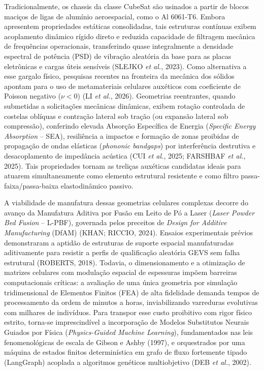 Tradicionalmente, os chassis da classe CubeSat são usinados a partir de blocos maciços de ligas de alumínio aeroespacial, como o Al 6061-T6. Embora apresentem propriedades estáticas consolidadas, tais estruturas contínuas exibem acoplamento dinâmico rígido direto e reduzida capacidade de filtragem mecânica de frequências operacionais, transferindo quase integralmente a densidade espectral de potência (PSD) de vibração aleatória da base para as placas eletrônicas e cargas úteis sensíveis (SLEJKO \textit{et al.}, 2023). Como alternativa a esse gargalo físico, pesquisas recentes na fronteira da mecânica dos sólidos apontam para o uso de metamateriais celulares auxéticos com coeficiente de Poisson negativo ($\nu < 0$) (LI \textit{et al.}, 2026). Geometrias reentrantes, quando submetidas a solicitações mecânicas dinâmicas, exibem rotação controlada de costelas oblíquas e contração lateral sob tração (ou expansão lateral sob compressão), conferindo elevada Absorção Específica de Energia (\textit{Specific Energy Absorption} -- SEA), resiliência a impactos e formação de zonas proibidas de propagação de ondas elásticas (\textit{phononic bandgaps}) por interferência destrutiva e desacoplamento de impedância acústica (CUI \textit{et al.}, 2025; FARSHBAF \textit{et al.}, 2025). Tais propriedades tornam as treliças auxéticas candidatas ideais para atuarem simultaneamente como elemento estrutural resistente e como filtro passa-faixa/passa-baixa elastodinâmico passivo.

A viabilidade de manufatura dessas geometrias celulares complexas decorre do avanço da Manufatura Aditiva por Fusão em Leito de Pó a Laser (\textit{Laser Powder Bed Fusion} -- L-PBF), governada pelos preceitos de \textit{Design for Additive Manufacturing} (DfAM) (KHAN; RICCIO, 2024). Ensaios experimentais prévios demonstraram a aptidão de estruturas de suporte espacial manufaturadas aditivamente para resistir a perfis de qualificação aleatória GEVS sem falha estrutural (ROBERTS, 2018). Todavia, o dimensionamento e a otimização de matrizes celulares com modulação espacial de espessuras impõem barreiras computacionais críticas: a avaliação de uma única geometria por simulação tridimensional de Elementos Finitos (FEA) de alta fidelidade demanda tempos de processamento da ordem de minutos a horas, inviabilizando varreduras evolutivas com milhares de indivíduos. Para transpor esse custo proibitivo com rigor físico estrito, torna-se imprescindível a incorporação de Modelos Substitutos Neurais Guiados por Física (\textit{Physics-Guided Machine Learning}), fundamentados nas leis fenomenológicas de escala de Gibson e Ashby (1997), e orquestrados por uma máquina de estados finitos determinística em grafo de fluxo fortemente tipado (LangGraph) acoplada a algoritmos genéticos multiobjetivo (DEB \textit{et al.}, 2002).

